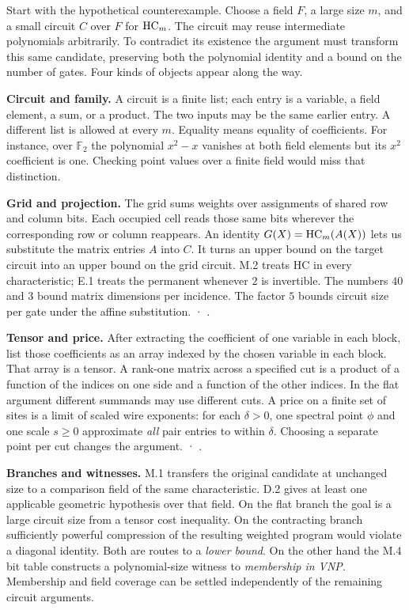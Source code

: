 \newpage
{}
\label{sec:reader}
Start with the hypothetical counterexample. Choose a field $F$, a large size $m$, and a small circuit $C$ over $F$ for $\mathrm{HC}_m$. The circuit may reuse intermediate polynomials arbitrarily. To contradict its existence the argument must transform this same candidate, preserving both the polynomial identity and a bound on the number of gates. Four kinds of objects appear along the way.

\textbf{Circuit and family.} A circuit is a finite list; each entry is a variable, a field element, a sum, or a product. The two inputs may be the same earlier entry. A different list is allowed at every $m$. Equality means equality of coefficients. For instance, over $\mathbb F_2$ the polynomial $x^2-x$ vanishes at both field elements but its $x^2$ coefficient is one. Checking point values over a finite field would miss that distinction. 

\textbf{Grid and projection.} The grid sums weights over assignments of shared row and column bits. Each occupied cell reads those same bits wherever the corresponding row or column reappears. An identity $G(X)=\mathrm{HC}_m(A(X))$ lets us substitute the matrix entries $A$ into $C$. It turns an upper bound on the target circuit into an upper bound on the grid circuit. M.2 treats HC in every characteristic; E.1 treats the permanent whenever $2$ is invertible. The numbers $40$ and $3$ bound matrix dimensions per incidence. The factor $5$ bounds circuit size per gate under the affine substitution.  · .

\textbf{Tensor and price.} After extracting the coefficient of one variable in each block, list those coefficients as an array indexed by the chosen variable in each block. That array is a tensor. A rank-one matrix across a specified cut is a product of a function of the indices on one side and a function of the other indices. In the flat argument different summands may use different cuts. A price on a finite set of sites is a limit of scaled wire exponents: for each $\delta>0$, one spectral point $\phi$ and one scale $s\ge0$ approximate \emph{all} pair entries to within $\delta$. Choosing a separate point per cut changes the argument.  · .

\textbf{Branches and witnesses.} M.1 transfers the original candidate at unchanged size to a comparison field of the same characteristic. D.2 gives at least one applicable geometric hypothesis over that field. On the flat branch the goal is a large circuit size from a tensor cost inequality. On the contracting branch sufficiently powerful compression of the resulting weighted program would violate a diagonal identity. Both are routes to a \emph{lower bound}. On the other hand the M.4 bit table constructs a polynomial-size witness to \emph{membership in VNP}. Membership and field coverage can be settled independently of the remaining circuit arguments.

